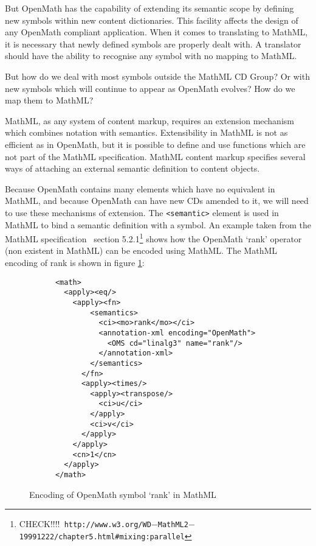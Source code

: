 But OpenMath has the capability of extending its semantic scope by
defining new symbols within new content dictionaries. This facility affects the design of any OpenMath
compliant application. When it comes to translating to MathML, it is
necessary that newly defined symbols are properly dealt with. A
translator should have the ability to recognise any symbol with no
mapping to MathML.

But how do we deal with most symbols outside the MathML CD Group? Or
with new symbols which will continue to appear as OpenMath evolves? How
do we map them to MathML?

MathML, as any system of content markup, requires
an extension mechanism which combines notation with semantics.
Extensibility in MathML is not as efficient as in OpenMath, but it is
possible to define and use functions which are not part of the MathML
specification. MathML content markup specifies several ways of
attaching an external semantic definition to content objects.

Because OpenMath contains many elements which have no equivalent in
MathML, and because OpenMath can have new CDs amended to it, we will
need to use these mechanisms of extension. The \verb|<semantic>|
element is used in MathML to bind a semantic definition with a symbol.
An example taken from the MathML specification~\cite{mathml} section
5.2.1\footnote{CHECK!!!!{\tt
http://www.w3.org/WD$-$MathML2$-$19991222/chapter5.html\#mixing:parallel}}
shows how the OpenMath `rank' operator (non existent in MathML) can be
encoded using MathML. The MathML encoding of rank is shown in figure
\ref{rank}:

\begin{figure}[h]
\begin{verbatim}
      <math>	
        <apply><eq/>
          <apply><fn>
              <semantics>
                <ci><mo>rank</mo></ci>
                <annotation-xml encoding="OpenMath">
                  <OMS cd="linalg3" name="rank"/>
                </annotation-xml>
              </semantics>
            </fn>
            <apply><times/>
              <apply><transpose/>
                <ci>u</ci>
              </apply>
              <ci>v</ci>
            </apply>
          </apply>
          <cn>1</cn>
        </apply>
      </math>
\end{verbatim}
\caption{Encoding of OpenMath symbol `rank' in MathML}
\label{rank}
\end{figure}

